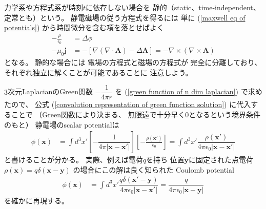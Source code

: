 力学系や方程式系が時刻$t$に依存しない場合を
静的（static、time-independent、定常とも）という。
静電磁場の従う方程式を得るには
単に
(\ref{maxwell eq of potentials})
から時間微分を含む項を落とせばよく
\begin{subequations}
\begin{align}
  - \frac{\rho}{\epsilon_0}
&=
  \Delta \phi
\label{static eq for ele-mag scalar potential}
\\
  - \mu_0 \bm{j}
&=
  - [
    \nabla
    ( \nabla \cdot \bm{A} )
  -
    \Delta \bm{A}
  ]
=
  - \nabla \times
    (\nabla \times \bm{A})
\label{static eq for ele-mag vector potential}
\end{align}
\end{subequations}
となる。
静的な場合には
電場の方程式と磁場の方程式が
完全に分離しており、
それぞれ独立に解くことが可能であることに
注意しよう。

$3$次元LaplacianのGreen関数
$ - \dfrac{1}{4 \pi r} $
を
(\ref{green function of n dim laplacian})
で求めたので、
公式
(\ref{convolution representation of green function solution})
に代入することで
（Green関数により決まる、
無限遠で十分早く$0$となるという境界条件のもと）
静電場のscalar potentialは
\begin{align}
  \phi (\bm{x})
&=
  \int d^3 x'
  \left[
    - \dfrac{1}{
      4 \pi |\bm{x} - \bm{x}'|
    }
  \right]
  \left[
    - \frac{\rho(\bm{x}')}{\epsilon_0}
  \right]
=
  \int d^3 x'
    \dfrac{\rho(\bm{x}')}{
      4 \pi \epsilon_0
      |\bm{x} - \bm{x}'|
    }
\end{align}
と書けることが分かる。
実際、例えば電荷$q$を持ち
位置$\bm{y}$に固定された点電荷
$\rho(\bm{x})
= q \delta(\bm{x} - \bm{y})$
の場合にこの解は良く知られた
Coulomb potential
\begin{align}
  \phi (\bm{x})
&=
  \int d^3 x'
    \dfrac{
      q \delta(\bm{x}' - \bm{y})
    }{
      4 \pi \epsilon_0
      |\bm{x} - \bm{x}'|
    }
=
    \dfrac{ q }{
      4 \pi \epsilon_0
      |\bm{x} - \bm{y}|
    }
\label{coulomb potential of point charge}
\end{align}
を確かに再現する。

